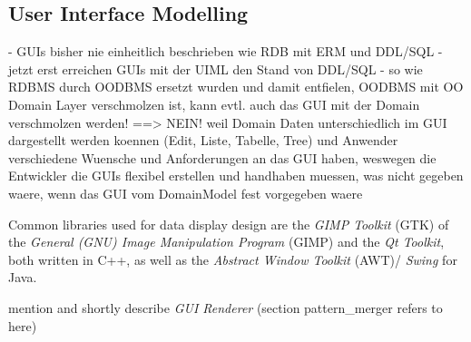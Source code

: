 %
%
%
%
%
%
%

\subsection{User Interface Modelling}
\label{user_interface_modelling_heading}

- GUIs bisher nie einheitlich beschrieben wie RDB mit ERM und DDL/SQL
- jetzt erst erreichen GUIs mit der UIML den Stand von DDL/SQL
- so wie RDBMS durch OODBMS ersetzt wurden und damit entfielen,
OODBMS mit OO Domain Layer verschmolzen ist, kann evtl. auch das GUI
mit der Domain verschmolzen werden! ==> NEIN! weil Domain Daten unterschiedlich
im GUI dargestellt werden koennen (Edit, Liste, Tabelle, Tree) und Anwender
verschiedene Wuensche und Anforderungen an das GUI haben, weswegen die Entwickler
die GUIs flexibel erstellen und handhaben muessen, was nicht gegeben waere,
wenn das GUI vom DomainModel fest vorgegeben waere

Common libraries used for data display design are the \emph{GIMP Toolkit} (GTK)
of the \emph{General (GNU) Image Manipulation Program} (GIMP) and the \emph{Qt Toolkit},
both written in C++, as well as the \emph{Abstract Window Toolkit} (AWT)/ \emph{Swing}
for Java.

mention and shortly describe \emph{GUI Renderer} (section pattern_merger refers to here)




